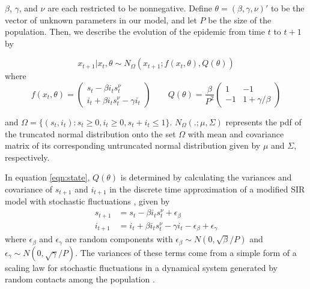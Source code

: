 \documentclass{elsarticle}
\begin{document}
\noindent $\beta$, $\gamma$, and $\nu$ are each restricted to be nonnegative. Define $\theta = (\beta,\gamma,\nu)'$ to be the vector of unknown parameters in our model, and let $P$ be the size of the population. Then, we describe the evolution of the epidemic from time $t$ to $t + 1$ by

\begin{equation}
x_{t+1}\left|x_t,\theta\right. \sim N_\Omega\left(x_{t+1};f(x_t,\theta),Q(\theta)\right) \label{eqn:state}
\end{equation}
\noindent where
\[
f(x_t,\theta) = \left(
\begin{array}{c}
s_t - \beta i_ts^\nu_t \phantom{- \gamma i_t}\,\, \\
i_t +  \beta i_ts^\nu_t - \gamma i_t
\end{array}
\right)
\qquad
Q(\theta) = \frac{\beta}{P^2} \left(
\begin{array}{ccccc}
1 & -1 \\
-1 & 1 + \gamma/\beta
\end{array}
\right)
\]

\noindent and $\Omega = \{(s_t,i_t): s_t \ge 0, i_t \ge 0, s_t + i_t \le 1\}$. $N_{\Omega}(.; \mu,\Sigma)$ represents the pdf of the truncated normal distribution onto the set $\Omega$ with mean and covariance matrix of its corresponding untruncated normal distribution given by $\mu$ and $\Sigma$, respectively.

In equation \eqref{eqn:state}, $Q(\theta)$ is determined by calculating the variances and covariance of $s_{t+1}$ and $i_{t+1}$ in the discrete time approximation of a modified SIR model with stochastic fluctuations \citep{herwaarden1995stochepid, dangerfield2009stochepid, anderson2004sars}, given by
\begin{align*}
s_{t+1} &= s_t - \beta i_ts^\nu_t + \epsilon_\beta \\
i_{t+1} &= i_t + \beta i_ts^\nu_t - \gamma i_t - \epsilon_\beta + \epsilon_\gamma
\end{align*}
where $\epsilon_\beta$ and $\epsilon_\gamma$ are random components with $\epsilon_\beta \sim N(0, \sqrt{\beta} / P)$ and $\epsilon_\gamma \sim N(0, \sqrt{\gamma} / P)$. The variances of these terms come from a simple form of a scaling law for stochastic fluctuations in a dynamical system generated by random contacts among the population \citep{ovaskainen2010extinction, herwaarden1995stochepid, dangerfield2009stochepid, skvortsov2012monitoring}.
\end{document}
